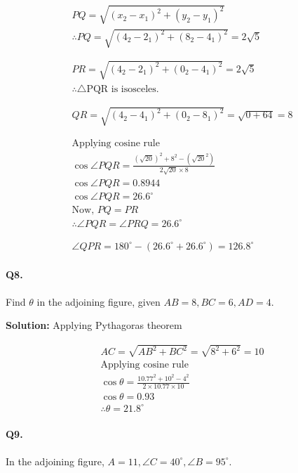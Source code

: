 \documentclass{article}
\begin{document}
\[
  \begin{aligned}
    PQ = \sqrt{(x_{2}-x_{1})^{2}+(y_{2}-y_{1})^{2}} \\
    \therefore PQ = \sqrt{(4_{2}-2_{1})^{2}+(8_{2}-4_{1})^{2}} = 2\sqrt{5} \\
    \\
    \\
    PR = \sqrt{(4_{2}-2_{1})^{2}+(0_{2}-4_{1})^{2}} = 2\sqrt{5} \\
    \therefore \triangle \text{PQR is isosceles.} \\
    \\
    \\
    QR = \sqrt{(4_{2}-4_{1})^{2}+(0_{2}-8_{1})^{2}} = \sqrt{0+64} = 8 \\
    \\
    \\
    \text{Applying cosine rule} \\
    \cos \angle PQR = \frac{(\sqrt{20})^{2}+8^{2}-(\sqrt{20}^{2})}{2\sqrt{20}\times 8} \\
    \cos \angle PQR = 0.8944 \\
    \cos \angle PQR = 26.6^{\circ} \\
    \text{Now, } PQ = PR \\
    \therefore \angle PQR = \angle PRQ = 26.6^{\circ} \\
    \\
    \\
    \angle QPR = 180^{\circ}-(26.6^{\circ}+26.6^{\circ}) = 126.8^{\circ}
  \end{aligned}
\]

\paragraph{Q8.}
Find $\theta$ in the adjoining figure, given $AB=8, BC=6, AD=4$.

{\scriptsize \textbf{Solution:}}
Applying Pythagoras theorem

\[
  \begin{aligned}
    AC = \sqrt{AB^{2}+BC^{2}} = \sqrt{8^{2}+6^{2}} = 10 \\
    \text{Applying cosine rule} \\
    \cos \theta = \frac{10.77^{2}+10^{2}-4^{2}}{2 \times 10.77 \times 10} \\
    \cos \theta = 0.93 \\
    \therefore \theta = 21.8^{\circ}
  \end{aligned}
\]

\paragraph{Q9.}
In the adjoining figure, $A=11, \angle C = 40^{\circ}, \angle B=95^{\circ}$.
\end{document}
